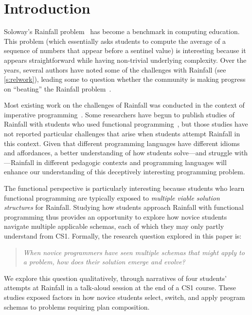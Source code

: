 \section{Introduction}

Soloway's Rainfall problem~\cite{soloway-learning86} has become a benchmark in
computing education. This problem (which essentially asks students to
compute the average of a sequence of numbers that appear before a
sentinel value) is interesting because it appears straightforward
while having non-trivial underlying complexity.  Over the years,
several authors have noted some of the challenges with Rainfall (see \cref{s:relwork}),
leading some to question whether the community is making progress on
``beating'' the Rainfall problem~\cite{guzdial-rainfall-blog-aug10}.

Most existing work on the challenges of Rainfall was conducted in
the context of imperative programming~\cite{seppala-how-hard-rainfall-koli15,simon-rainfall-harder13,soloway-learning86,venables-tracing09}.  Some researchers have begun to
publish studies of Rainfall with students who used functional
programming~\cite{fisler-recurring-rainfall14}, but those studies have not reported particular challenges
that arise when students attempt Rainfall in this context.  Given that
different programming languages have different idioms and affordances, a better
understanding of how students solve---and struggle with---Rainfall in
different pedagogic contexts and programming languages will enhance
our understanding of this deceptively interesting programming problem.

The functional perspective is particularly interesting because
students who learn functional programming are typically exposed to
\emph{multiple viable solution structures} for Rainfall.  Studying how
students approach Rainfall with functional programming thus provides
an opportunity to explore how novice students navigate multiple
applicable schemas, each of which they may only partly understand from
CS1.  Formally, the research question explored in this paper is:

\begin{quote}\it
  When novice programmers have seen multiple schemas that might apply to a
  problem, how does their solution emerge and evolve?
\end{quote}

\noindent We explore this question qualitatively, through narratives of
four students' attempts at Rainfall in a talk-aloud session at the end
of a CS1 course. These studies exposed factors in how novice students select,
switch, and apply program schemas to problems requiring plan composition.

